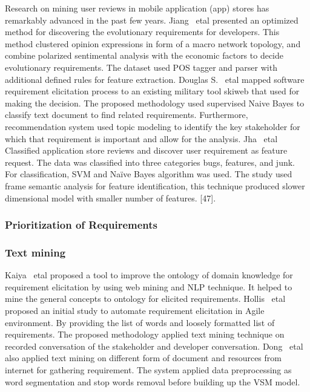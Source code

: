 Research on mining user reviews in mobile application (app) stores has
remarkably advanced in the past few years. Jiang ~etal \cite{Jiang:2014}
presented an optimized method for discovering the evolutionary requirements for
developers. This method clustered opinion expressions in form of a macro network
topology, and combine polarized sentimental analysis with the economic factors
to decide evolutionary requirements. The dataset used POS tagger and parser with
additional defined rules for feature extraction. Douglas S. ~etal
\cite{Douglas:S2008} mapped software requirement elicitation process to an
existing military tool skiweb that used for making the decision. The proposed
methodology used supervised Naive Bayes to classify text document to find
related requirements. Furthermore, recommendation system used topic modeling to
identify the key stakeholder for which that requirement is important and allow
for the analysis. Jha ~etal \cite{Jha:2017} Classified application store reviews
and discover user requirement as feature request. The data was classified into
three categories bugs, features, and junk. For classification, SVM and Naïve
Bayes algorithm was used. The study used frame semantic analysis for feature
identification, this technique produced slower  dimensional model
with smaller number of features. [47]. \\

\subsubsection{Prioritization of Requirements} 

\subsubsection{Text mining} 
 Kaiya ~etal \cite {Kaiya:2010} proposed a
tool to improve the ontology of domain knowledge for requirement elicitation by using web mining and NLP
technique. It helped to mine the general
concepts to ontology for elicited requirements.
Hollis ~etal               \cite{Hollis2017} proposed an initial study to
automate requirement elicitation in Agile environment. By providing the list of
words and loosely formatted list of requirements. The proposed methodology
applied text mining technique on recorded conversation of the stakeholder and
developer conversation. Dong ~etal \cite{dong2010}  also applied text mining on
different form of  document and resources from internet for  gathering
requirement. The system applied data preprocessing as word segmentation and stop
words removal before building up the VSM model. 
